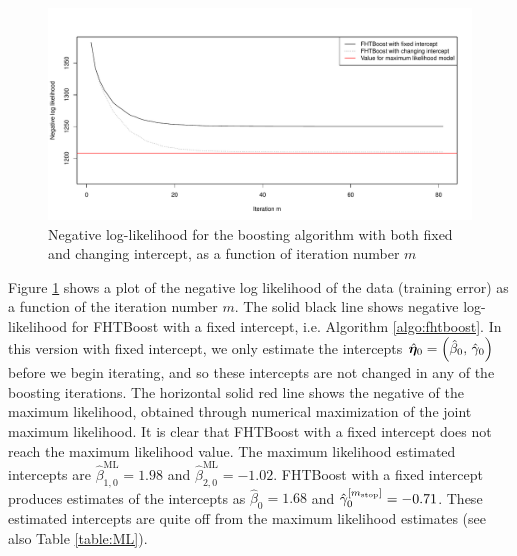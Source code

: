 \begin{figure}
\caption{Negative log-likelihood for the boosting algorithm with both fixed and changing intercept, as a function of iteration number $m$}
\label{fig:boosting-ML}
\centering\includegraphics[scale=0.4]{figures/small_example.pdf}
\end{figure}
Figure \ref{fig:boosting-ML} shows a plot of the negative log likelihood of the data (training error) as a function of the iteration number $m$.
The solid black line shows negative log-likelihood for FHTBoost with a fixed intercept, i.e. Algorithm \ref{algo:fhtboost}.
In this version with fixed intercept, we only estimate the intercepts $\hat{\boldsymbol{\eta}}_0=\left(\hat{\beta}_{0},\,\hat{\gamma}_{0}\right)$ before we begin iterating, and so these intercepts are not changed in any of the boosting iterations.
The horizontal solid red line shows the negative of the maximum likelihood, obtained through numerical maximization of the joint maximum likelihood.
It is clear that FHTBoost with a fixed intercept does not reach the maximum likelihood value.
The maximum likelihood estimated intercepts are $\hat{\beta}^{\text{ML}}_{1,0}=1.98$ and $\hat{\beta}^{\text{ML}}_{2,0}=-1.02$.
FHTBoost with a fixed intercept produces estimates of the intercepts as $\hat{\beta}_{0}=1.68$ and $\hat{\gamma}^{[m_{\text{stop}}]}_{0}=-0.71$.
These estimated intercepts are quite off from the maximum likelihood estimates (see also Table \ref{table:ML}).


